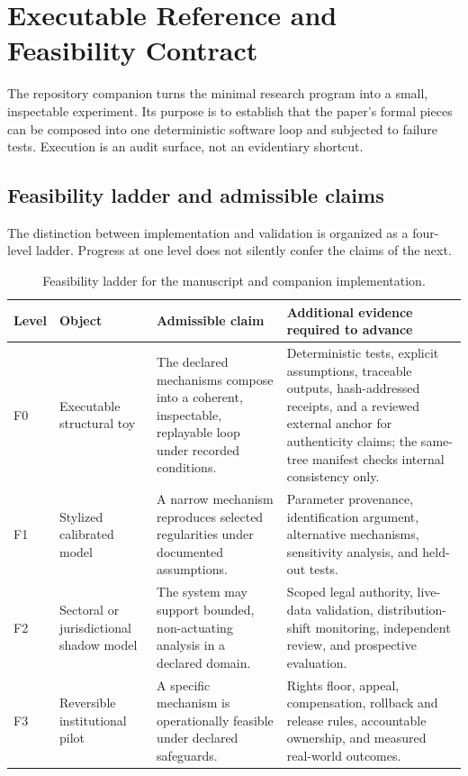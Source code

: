 \documentclass[11pt,a4paper]{article}
\numberwithin{equation}{section}
\theoremstyle{definition}
\theoremstyle{plain}
\theoremstyle{remark}
\begin{document}
\section{Executable Reference and Feasibility Contract}

The repository companion turns the minimal research program into a small, inspectable experiment. Its purpose is to establish that the paper's formal pieces can be composed into one deterministic software loop and subjected to failure tests. Execution is an audit surface, not an evidentiary shortcut.

\subsection{Feasibility ladder and admissible claims}

The distinction between implementation and validation is organized as a four-level ladder. Progress at one level does not silently confer the claims of the next.

\begin{table}[H]
\centering
\small
\caption{Feasibility ladder for the manuscript and companion implementation.}
\label{tab:feasibility}
\begin{tabularx}{\textwidth}{@{}L{0.08\textwidth}L{0.24\textwidth}Y Y@{}}
\toprule
\textbf{Level} & \textbf{Object} & \textbf{Admissible claim} & \textbf{Additional evidence required to advance} \\
\midrule
F0 & Executable structural toy & The declared mechanisms compose into a coherent, inspectable, replayable loop under recorded conditions. & Deterministic tests, explicit assumptions, traceable outputs, hash-addressed receipts, and a reviewed external anchor for authenticity claims; the same-tree manifest checks internal consistency only. \\
\addlinespace
F1 & Stylized calibrated model & A narrow mechanism reproduces selected regularities under documented assumptions. & Parameter provenance, identification argument, alternative mechanisms, sensitivity analysis, and held-out tests. \\
\addlinespace
F2 & Sectoral or jurisdictional shadow model & The system may support bounded, non-actuating analysis in a declared domain. & Scoped legal authority, live-data validation, distribution-shift monitoring, independent review, and prospective evaluation. \\
\addlinespace
F3 & Reversible institutional pilot & A specific mechanism is operationally feasible under declared safeguards. & Rights floor, appeal, compensation, rollback and release rules, accountable ownership, and measured real-world outcomes. \\
\bottomrule
\end{tabularx}
\end{table}
\end{document}
